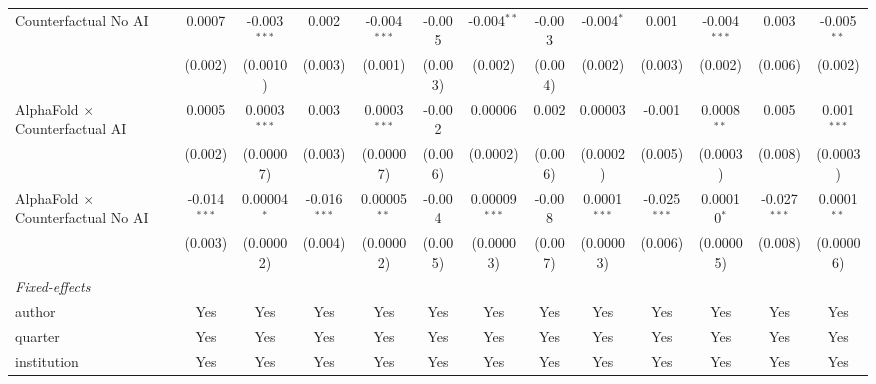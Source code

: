 \begin{tabular}{lcccccccccccc}
   Counterfactual No AI                     & 0.0007         & -0.003$^{***}$ & 0.002          & -0.004$^{***}$ & -0.005         & -0.004$^{**}$   & -0.003        & -0.004$^{*}$   & 0.001          & -0.004$^{***}$ & 0.003          & -0.005$^{**}$\\   
                                            & (0.002)        & (0.0010)       & (0.003)        & (0.001)        & (0.003)        & (0.002)         & (0.004)       & (0.002)        & (0.003)        & (0.002)        & (0.006)        & (0.002)\\   
   AlphaFold $\times$ Counterfactual AI     & 0.0005         & 0.0003$^{***}$ & 0.003          & 0.0003$^{***}$ & -0.002         & 0.00006         & 0.002         & 0.00003        & -0.001         & 0.0008$^{**}$  & 0.005          & 0.001$^{***}$\\   
                                            & (0.002)        & (0.00007)      & (0.003)        & (0.00007)      & (0.006)        & (0.0002)        & (0.006)       & (0.0002)       & (0.005)        & (0.0003)       & (0.008)        & (0.0003)\\   
   AlphaFold $\times$ Counterfactual No AI  & -0.014$^{***}$ & 0.00004$^{*}$  & -0.016$^{***}$ & 0.00005$^{**}$ & -0.004         & 0.00009$^{***}$ & -0.008        & 0.0001$^{***}$ & -0.025$^{***}$ & 0.00010$^{*}$  & -0.027$^{***}$ & 0.0001$^{**}$\\   
                                            & (0.003)        & (0.00002)      & (0.004)        & (0.00002)      & (0.005)        & (0.00003)       & (0.007)       & (0.00003)      & (0.006)        & (0.00005)      & (0.008)        & (0.00006)\\   
   \midrule
   \emph{Fixed-effects}\\
   author                                   & Yes            & Yes            & Yes            & Yes            & Yes            & Yes             & Yes           & Yes            & Yes            & Yes            & Yes            & Yes\\  
   quarter                                  & Yes            & Yes            & Yes            & Yes            & Yes            & Yes             & Yes           & Yes            & Yes            & Yes            & Yes            & Yes\\  
   institution                              & Yes            & Yes            & Yes            & Yes            & Yes            & Yes             & Yes           & Yes            & Yes            & Yes            & Yes            & Yes\\  

\end{tabular}
